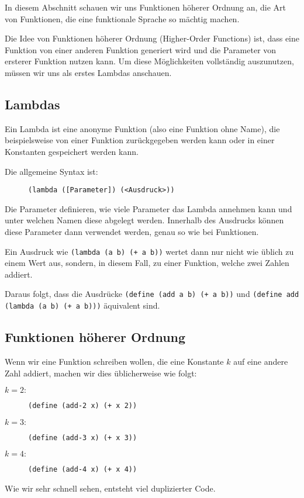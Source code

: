 \label{sec:higher_order_func}

In diesem Abschnitt schauen wir uns Funktionen höherer Ordnung an, die Art von Funktionen, die eine funktionale Sprache so mächtig machen.

Die Idee von Funktionen höherer Ordnung (Higher-Order Functions) ist, dass eine Funktion von einer anderen Funktion generiert wird und die Parameter von ersterer Funktion nutzen kann. Um diese Möglichkeiten vollständig auszunutzen, müssen wir uns als erstes Lambdas anschauen.

\subsection{Lambdas}
	Ein Lambda ist eine anonyme Funktion (also eine Funktion ohne Name), die beispielsweise von einer Funktion zurückgegeben werden kann oder in einer Konstanten gespeichert werden kann.
	
	Die allgemeine Syntax ist:
	\begin{figure}[H]
		\centering
		\lstinline[language = Racket]|(lambda ([Parameter]) (<Ausdruck>))|
	\end{figure}
	Die Parameter definieren, wie viele Parameter das Lambda annehmen kann und unter welchen Namen diese abgelegt werden. Innerhalb des Ausdrucks können diese Parameter dann verwendet werden, genau so wie bei Funktionen.
	
	Ein Ausdruck wie \lstinline[language = Racket]|(lambda (a b) (+ a b))| wertet dann nur nicht wie üblich zu einem Wert aus, sondern, in diesem Fall, zu einer Funktion, welche zwei Zahlen addiert.
	
	Daraus folgt, dass die Ausdrücke \lstinline[language = Racket]|(define (add a b) (+ a b))| und \lstinline[language = Racket]|(define add (lambda (a b) (+ a b)))| äquivalent sind.

\subsection{Funktionen höherer Ordnung}
	Wenn wir eine Funktion schreiben wollen, die eine Konstante \(k\) auf eine andere Zahl addiert, machen wir dies üblicherweise wie folgt:
	\begin{description}
		\item[\( k = 2: \)] \qquad \lstinline[language = Racket]|(define (add-2 x) (+ x 2))|
		\item[\( k = 3: \)] \qquad \lstinline[language = Racket]|(define (add-3 x) (+ x 3))|
		\item[\( k = 4: \)] \qquad \lstinline[language = Racket]|(define (add-4 x) (+ x 4))|
	\end{description}
	Wie wir sehr schnell sehen, entsteht viel duplizierter Code.
	
